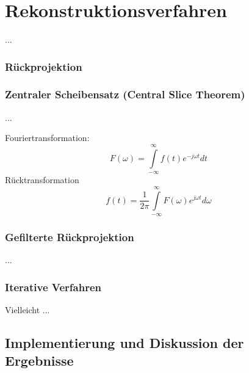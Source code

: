 \chapter{Rekonstruktionsverfahren}
\label{cha:Rekonstruktionsverfahren}
...

\subsection{Rückprojektion}


\subsection{Zentraler Scheibensatz (Central Slice Theorem)}

...


Fouriertransformation:
\begin{equation}
F(\omega) = \int\limits_{- \infty}^{\infty}f(t)e^{-j\omega t}dt
\end{equation}
Rücktransformation
\begin{equation}
f(t) = \frac{1}{2\pi}\int\limits_{- \infty}^{\infty}F(\omega)e^{j\omega t}d\omega
\end{equation}

\subsection{Gefilterte Rückprojektion}

...

\subsection{Iterative Verfahren}

Vielleicht ...




\newpage
\section{Implementierung und Diskussion der Ergebnisse}


